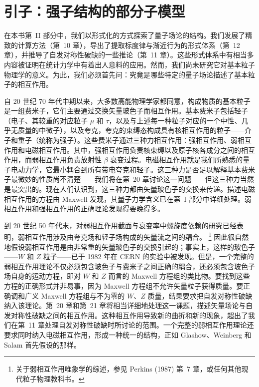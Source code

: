 \chapter{引子：强子结构的部分子模型}

在本书第~II 部分中，我们以形式化的方式探索了量子场论的结构。我们发展了精致的计算方法（第~10 章），导出了提取标度律与渐近行为的形式体系（第~12 章），并推导了自发对称性破缺的一些推论（第~11 章）。这些形式体系中有相当多内容被证明在统计力学中有着出人意料的应用。然而，我们尚未研究它对基本粒子物理学的意义。为此，我们必须首先问：究竟是哪些特定的量子场论描述了基本粒子的相互作用。

自 20 世纪 70 年代中期以来，大多数高能物理学家都同意，构成物质的基本粒子是一组费米子，它们主要通过交换矢量玻色子而相互作用。基本费米子包括轻子（电子、其较重的对应粒子 $\mu$ 和 $\tau$，以及与上述每一种粒子对应的一个中性、几乎无质量的中微子），以及夸克，夸克的束缚态构成具有核相互作用的粒子——介子和重子（统称为强子）。这些费米子通过三种力相互作用：强相互作用、弱相互作用和电磁相互作用。其中，强相互作用负责核束缚以及原子核各成分之间的相互作用，而弱相互作用负责放射性 $\beta$ 衰变过程。电磁相互作用就是我们所熟悉的量子电动力学，它最小耦合到所有带电夸克和轻子。这三种力是否足以解释基本费米子最微妙的性质尚不清楚——我们将在第~20 章讨论这一问题——但这三种力当然是最突出的。现在人们认识到，这三种力都由矢量玻色子的交换来传递。描述电磁相互作用的方程由 Maxwell 发现，其量子力学含义已在第~I 部分中详细处理。弱相互作用和强相互作用的正确理论发现得要晚得多。

到 20 世纪 50 年代末，对弱相互作用截面与衰变率中螺旋度依赖的研究已经表明，弱相互作用涉及由夸克场和轻子场构成的矢量流之间的耦合。%
\footnote{关于弱相互作用唯象学的综述，参见 Perkins (1987) 第~7 章，或任何其他现代粒子物理教科书。} 因此很自然地假设弱相互作用是由非常重的矢量玻色子的交换引起的；事实上，这样的玻色子——$W$ 和 $Z$ 粒子——已于 1982 年在 CERN 的实验中被发现。但是，一个完整的弱相互作用理论不仅必须包含玻色子与费米子之间正确的耦合，还必须包含玻色子场自身的运动方程，即对 $W$ 和 $Z$ 而言的 Maxwell 方程组的类比物。要找到这些方程的正确形式并非易事，因为 Maxwell 方程组不允许矢量粒子获得质量。要正确调和广义 Maxwell 方程组与不为零的 $W$、$Z$ 质量，结果要求把自发对称性破缺纳入该理论。第~20 章和第~21 章将相当详细地处理这一课题，描述矢量场论与自发对称性破缺之间的相互作用。这种相互作用导致新的曲折和新的现象，超出了我们在第~11 章处理自发对称性破缺时所讨论的范围。一个完整的弱相互作用理论还要求同时纳入电磁相互作用，形成一种统一的结构，正如 Glashow、Weinberg 和 Salam 首先假设的那样。

